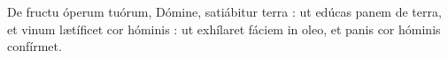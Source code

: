 De fructu óperum tuórum, Dómine, satiábitur terra : ut edúcas panem de terra, et vinum lætíficet cor hóminis : ut exhílaret fáciem in oleo, et panis cor hóminis confírmet.
